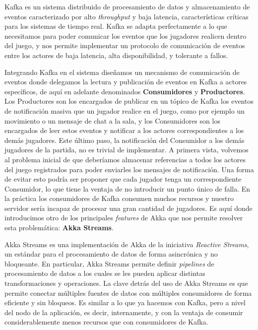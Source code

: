 Kafka es un sistema distribuido de procesamiento de datos y almacenamiento de eventos caracterizado
por alto \textit{throughput} y baja latencia, características críticas para los sistemas de tiempo real.
Kafka se adapta perfectamente a lo que necesitamos para poder comunicar los eventos que los jugadores
realicen dentro del juego, y nos permite implementar un protocolo de comunicación de eventos entre los actores
de baja latencia, alta disponibilidad, y tolerante a fallos.

Integrando Kafka en el sistema diseñamos un mecanismo de comunicación de eventos donde delegamos la lectura
y publicación de eventos en Kafka a actores específicos, de aquí en adelante denominados \textbf{Consumidores}
y \textbf{Productores}. Los Productores son los encargados de publicar en un tópico de Kafka los eventos de notificación masiva
que un jugador realice en el juego, como por ejemplo un movimiento o un mensaje de chat a la sala, y los Consumidores
son los encargados de leer estos eventos y notificar a los actores correspondientes a los demás jugadores.
Este último paso, la notificación del Consumidor a los demás jugadores de la partida, no es trivial de implementar.
A primera vista, volvemos al problema inicial de que deberíamos almacenar referencias a todos los actores del juego registrados
para poder enviarles los mensajes de notificación. Una forma de evitar esto podría ser proponer que cada jugador tenga un correspondiente
Consumidor, lo que tiene la ventaja de no introducir un punto único de falla. En la práctica los consumidores de Kafka consumen muchos recursos y
nuestro servidor sería incapaz de procesar una gran cantidad de jugadores.
Es aquí donde introducimos otro de los principales \textit{features} de Akka que nos permite resolver esta problemática:
\textbf{Akka Streams}.

Akka Streams es una implementación de Akka de la iniciativa \textit{Reactive Streams}, un estándar para el procesamiento de datos de forma asincrónica y no bloqueante.
En particular, Akka Streams permite definir \textit{pipelines} de procesamiento de datos a los cuales se les pueden aplicar distintas transformaciones y operaciones.
La clave detrás del uso de Akka Streams es que permite conectar múltiples fuentes de datos con múltiples consumidores de forma eficiente y sin bloqueos. Es similar a
lo que ya hacemos con Kafka, pero a nivel del nodo de la aplicación, es decir, internamente, y con la ventaja de consumir considerablemente menos recursos que con
consumidores de Kafka.

